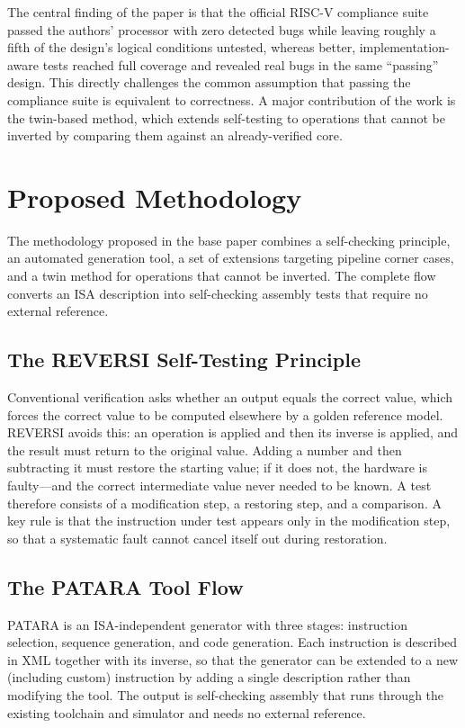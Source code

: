 \documentclass[12pt,a4paper]{report}
\begin{document}
The central finding of the paper is that the official RISC-V compliance suite passed the
authors' processor with zero detected bugs while leaving roughly a fifth of the design's
logical conditions untested, whereas better, implementation-aware tests reached full
coverage and revealed real bugs in the same ``passing'' design. This directly challenges the
common assumption that passing the compliance suite is equivalent to correctness. A major
contribution of the work is the twin-based method, which extends self-testing to operations
that cannot be inverted by comparing them against an already-verified core.

\section{Proposed Methodology}
The methodology proposed in the base paper combines a self-checking principle, an automated
generation tool, a set of extensions targeting pipeline corner cases, and a twin method for
operations that cannot be inverted. The complete flow converts an ISA description into
self-checking assembly tests that require no external reference.

\subsection{The REVERSI Self-Testing Principle}
Conventional verification asks whether an output equals the correct value, which forces the
correct value to be computed elsewhere by a golden reference model. REVERSI avoids this: an
operation is applied and then its inverse is applied, and the result must return to the
original value. Adding a number and then subtracting it must restore the starting value; if
it does not, the hardware is faulty---and the correct intermediate value never needed to be
known. A test therefore consists of a modification step, a restoring step, and a comparison.
A key rule is that the instruction under test appears only in the modification step, so that
a systematic fault cannot cancel itself out during restoration.

\subsection{The PATARA Tool Flow}
PATARA is an ISA-independent generator with three stages: instruction selection, sequence
generation, and code generation. Each instruction is described in XML together with its
inverse, so that the generator can be extended to a new (including custom) instruction by
adding a single description rather than modifying the tool. The output is self-checking
assembly that runs through the existing toolchain and simulator and needs no external
reference.
\end{document}
